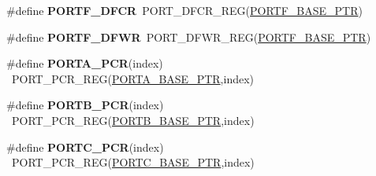 \begin{DoxyCompactItemize}
\item 
\hypertarget{group___p_o_r_t___register___accessor___macros_ga046976ba6c85101e6b85706ae5595214}{}\#define {\bfseries P\+O\+R\+T\+F\+\_\+\+D\+F\+C\+R}~P\+O\+R\+T\+\_\+\+D\+F\+C\+R\+\_\+\+R\+E\+G(\hyperlink{group___p_o_r_t___peripheral_gadda5d5c0c6f7d718ac2ea336aea4f905}{P\+O\+R\+T\+F\+\_\+\+B\+A\+S\+E\+\_\+\+P\+T\+R})\label{group___p_o_r_t___register___accessor___macros_ga046976ba6c85101e6b85706ae5595214}

\item 
\hypertarget{group___p_o_r_t___register___accessor___macros_ga1f8a12588f10b6a807f6b25033362adc}{}\#define {\bfseries P\+O\+R\+T\+F\+\_\+\+D\+F\+W\+R}~P\+O\+R\+T\+\_\+\+D\+F\+W\+R\+\_\+\+R\+E\+G(\hyperlink{group___p_o_r_t___peripheral_gadda5d5c0c6f7d718ac2ea336aea4f905}{P\+O\+R\+T\+F\+\_\+\+B\+A\+S\+E\+\_\+\+P\+T\+R})\label{group___p_o_r_t___register___accessor___macros_ga1f8a12588f10b6a807f6b25033362adc}

\item 
\hypertarget{group___p_o_r_t___register___accessor___macros_ga35d4fd0500a0759697a40137dea62a41}{}\#define {\bfseries P\+O\+R\+T\+A\+\_\+\+P\+C\+R}(index)                                              ~P\+O\+R\+T\+\_\+\+P\+C\+R\+\_\+\+R\+E\+G(\hyperlink{group___p_o_r_t___peripheral_gaa18ec7594fe603225220ec6eda4a19ce}{P\+O\+R\+T\+A\+\_\+\+B\+A\+S\+E\+\_\+\+P\+T\+R},index)\label{group___p_o_r_t___register___accessor___macros_ga35d4fd0500a0759697a40137dea62a41}

\item 
\hypertarget{group___p_o_r_t___register___accessor___macros_ga551c76757a3ebc18de031a5e45bee678}{}\#define {\bfseries P\+O\+R\+T\+B\+\_\+\+P\+C\+R}(index)                                              ~P\+O\+R\+T\+\_\+\+P\+C\+R\+\_\+\+R\+E\+G(\hyperlink{group___p_o_r_t___peripheral_ga585b4782d1ceb44492289af0019480f9}{P\+O\+R\+T\+B\+\_\+\+B\+A\+S\+E\+\_\+\+P\+T\+R},index)\label{group___p_o_r_t___register___accessor___macros_ga551c76757a3ebc18de031a5e45bee678}

\item 
\hypertarget{group___p_o_r_t___register___accessor___macros_ga7eac1367167d119a0388f82fe7f8dd44}{}\#define {\bfseries P\+O\+R\+T\+C\+\_\+\+P\+C\+R}(index)                                              ~P\+O\+R\+T\+\_\+\+P\+C\+R\+\_\+\+R\+E\+G(\hyperlink{group___p_o_r_t___peripheral_ga03c740cdda17711afafc932723871474}{P\+O\+R\+T\+C\+\_\+\+B\+A\+S\+E\+\_\+\+P\+T\+R},index)\label{group___p_o_r_t___register___accessor___macros_ga7eac1367167d119a0388f82fe7f8dd44}


\end{DoxyCompactItemize}
